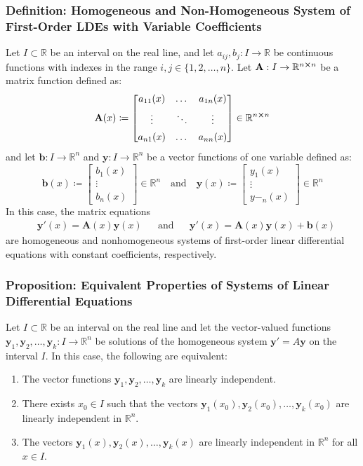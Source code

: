\documentclass[11pt, a4paper]{article}
\newcommand{\R}{\mathbb{R}} %
\begin{document}
\subsubsection{Definition: Homogeneous and Non-Homogeneous System of First-Order LDEs with Variable Coefficients}
Let $ I \subset \R $ be an interval on the real line, and let $ a_{ij}, b_j: I \to \R $ be continuous functions with indexes in the range $ i, j \in \{1, 2, \dots, n \} $. Let $ \mathbf{A}: I \to \R^{n \cross n} $ be a matrix function defined as:
\[
\mathbf{A}(x) \coloneqq
\begin{bmatrix}
	a_{11}(x) & \dots & a_{1n}(x) \\[1.0ex]
	\vdots & \ddots & \vdots \\[1.0ex]
	a_{n1}(x) & \dots & a_{nn}(x) 
\end{bmatrix} 
\in \R^{n \cross n}
\]
and let $ \bm{b} : I \to \R^n $ and $ \bm{y} : I \to \R^n $ be a vector functions of one variable defined as:
\[
\bm{b}(x) \coloneqq
\begin{bmatrix}
	b_1(x)\\[1.0ex]
	\vdots \\[1.0ex]
	b_n(x)
\end{bmatrix}
\in \R^{n}
\quad \text{and} \quad
\bm{y}(x) \coloneqq
\begin{bmatrix}
	y_1(x)\\[1.0ex]
	\vdots \\[1.0ex]
	y-_n(x)
\end{bmatrix}
\in \R^{n}
\]
In this case, the matrix equations
\begin{align*}
	& \bm{y}'(x) = \mathbf{A}(x) \bm{y}(x) && \text{and} && \bm{y}'(x) = \mathbf{A}(x) \bm{y}(x) + \bm{b}(x) 
\end{align*}
are homogeneous and nonhomogeneous systems of first-order linear differential equations with constant coefficients, respectively.

\subsubsection{Proposition: Equivalent Properties of Systems of Linear Differential Equations}
Let $ I \subset \R $ be an interval on the real line and let the vector-valued functions $ \bm{y}_1, \bm{y}_2, \dots, \bm{y}_k : I \to \R^n $ be solutions of the homogeneous system $ \bm{y}' = A \bm{y} $ on the interval $ I $. In this case, the following are equivalent:
\begin{enumerate}
	\item The vector functions $ \bm{y}_1, \bm{y}_2, \dots, \bm{y}_k $ are linearly independent.
	
	\item There exists $ x_0 \in I $ such that the vectors $ \bm{y}_1(x_0), \bm{y}_2(x_0), \dots, \bm{y}_k(x_0) $ are linearly independent in $ \R^n $.
	
	\item The vectors $ \bm{y}_1(x), \bm{y}_2(x), \dots, \bm{y}_k(x) $ are linearly independent in $ \R^n $ for all $ x \in I $.
	
\end{enumerate}
	
\end{document}
